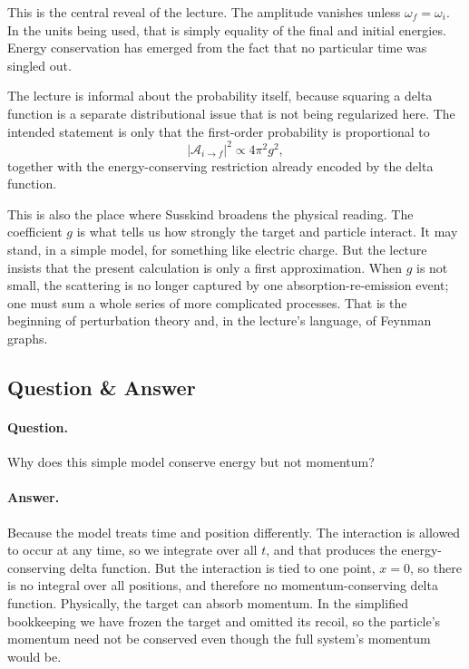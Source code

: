 This is the central reveal of the lecture. The amplitude vanishes unless \(\omega_f=\omega_i\). In the units being used, that is simply equality of the final and initial energies. Energy conservation has emerged from the fact that no particular time was singled out.

The lecture is informal about the probability itself, because squaring a delta function is a separate distributional issue that is not being regularized here. The intended statement is only that the first-order probability is proportional to
\begin{equation}
|\mathcal A_{i\to f}|^2\propto 4\pi^2 g^2,
\end{equation}
together with the energy-conserving restriction already encoded by the delta function.

This is also the place where Susskind broadens the physical reading. The coefficient \(g\) is what tells us how strongly the target and particle interact. It may stand, in a simple model, for something like electric charge. But the lecture insists that the present calculation is only a first approximation. When \(g\) is not small, the scattering is no longer captured by one absorption-re-emission event; one must sum a whole series of more complicated processes. That is the beginning of perturbation theory and, in the lecture's language, of Feynman graphs.

\subsection{Question \& Answer}

\paragraph{Question.} Why does this simple model conserve energy but not momentum?

\paragraph{Answer.} Because the model treats time and position differently. The interaction is allowed to occur at any time, so we integrate over all \(t\), and that produces the energy-conserving delta function. But the interaction is tied to one point, \(x=0\), so there is no integral over all positions, and therefore no momentum-conserving delta function. Physically, the target can absorb momentum. In the simplified bookkeeping we have frozen the target and omitted its recoil, so the particle's momentum need not be conserved even though the full system's momentum would be.


